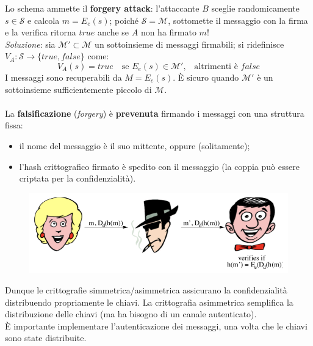 \documentclass[11pt, a4paper, twoside, italian]{report}
\theoremstyle{plain}
\begin{document}
\noindent
Lo schema ammette il \textbf{forgery attack}: l'attaccante $B$ sceglie randomicamente $s\in \mathcal{S}$ e calcola $m=E_e(s)$; poiché $\mathcal{S} = \mathcal{M}$, sottomette il messaggio con la firma e la verifica ritorna $true$ anche se $A$ non ha firmato $m$!\\
\textit{Soluzione}: sia $\mathcal{M}' \subset \mathcal{M}$ un sottoinsieme di messaggi firmabili; si ridefinisce $V_A: \mathcal{S} \rightarrow \{ true, false \}$ come: $$V_A(s) = true \text{~~~se~} E_e(s) \in \mathcal{M}' \text{, ~~altrimenti è~} false$$
\noindent
I messaggi sono recuperabili da $M = E_e(s)$. È sicuro quando $\mathcal{M}'$ è un sottoinsieme sufficientemente piccolo di $\mathcal{M}$.\\\\
La \textbf{falsificazione} (\textit{forgery}) è \textbf{prevenuta} firmando i messaggi con una struttura fissa:
\begin{itemize}
	\item il nome del messaggio è il suo mittente, oppure (solitamente);
	\item l'hash crittografico firmato è spedito con il messaggio (la coppia può essere criptata per la confidenzialità).
\end{itemize}
\begin{figure}[H]
	\centering
	\includegraphics[scale=0.59]{sig}
\end{figure}
\noindent
Dunque le crittografie simmetrica/asimmetrica assicurano la confidenzialità distribuendo propriamente le chiavi. La crittografia asimmetrica semplifica la distribuzione delle chiavi (ma ha bisogno di un canale autenticato).\\
È importante implementare l'autenticazione dei messaggi, una volta che le chiavi sono state distribuite.
\end{document}
